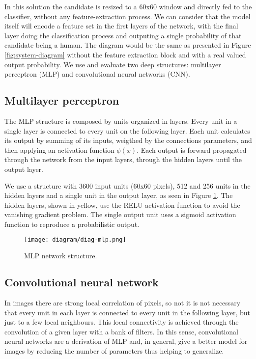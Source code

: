     In this solution the candidate is resized to a 60x60 window and directly fed to the classifier, without any feature-extraction process. We can consider that the model itself will encode a feature set in the first layers of the network, with the final layer doing the classification process and outputing a single probability of that candidate being a human. The diagram would be the same as presented in Figure \ref{fig:system-diagram} without the feature extraction block and with a real valued output probability. We use and evaluate two deep structures: multilayer perceptron (MLP) and convolutional neural networks (CNN).

    \subsection{Multilayer perceptron}
        The MLP structure is composed by units organized in layers. Every unit in a single layer is connected to every unit on the following layer. Each unit calculates its output by summing of its inputs, weigthed by the connections parameters, and then applying an activation function $\phi(x)$. Each output is forward propagated through the network from the input layers, through the hidden layers until the output layer.

        We use a structure with 3600 input units (60x60 pixels), 512 and 256 units in the hidden layers and a single unit in the output layer, as seen in Figure \ref{fig:diag-mlp}. The hidden layers, shown in yellow, use the RELU \cite{nair2010relu} activation function to avoid the vanishing gradient problem. The single output unit uses a sigmoid activation function to reproduce a probabilistic output.

        \begin{figure}
        \centering
        \texttt{[image: diagram/diag-mlp.png]}
        \caption{MLP network structure.}
        \label{fig:diag-mlp}
        \end{figure}

    \subsection{Convolutional neural network}
         In images there are strong local correlation of pixels, so not it is not necessary that every unit in each layer is connected to every unit in the following layer, but just to a few local neighbours. This local connectivity is achieved through the convolution of a given layer with a bank of filters. In this sense, convolutional neural networks are a derivation of MLP and, in general, give a better model for images by reducing the number of parameters thus helping to generalize.

